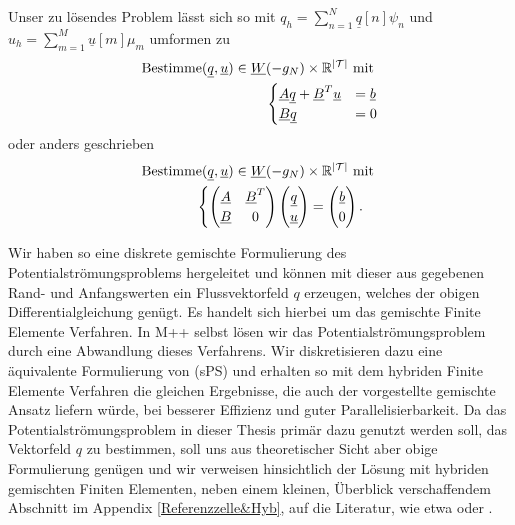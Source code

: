 Unser zu lösendes Problem lässt sich so mit $ q_h = \sum_{n=1}^{N} \underline{q}[n] \psi_n $ und $ u_h = \sum_{m=1}^{M} \underline{u}[m] \mu_m $ umformen zu 
\begin{align*}
\text{Bestimme} (\underline{q},\underline{u}) \in \underline{W}(-g_N)\times \mathbb{R}^{|\mathcal{T}|} \text{ mit }\\
\begin{cases}
\underline{A} \underline{q} + \underline{B}^T \underline{u} &= \underline{b} \\
\underline{B} \underline{q} &= 0
\end{cases}
\end{align*}
oder anders geschrieben 
\begin{align*}
\text{Bestimme} (\underline{q},\underline{u}) \in \underline{W}(-g_N)\times \mathbb{R}^{|\mathcal{T}|} \text{ mit }\\
\begin{cases}
\begin{pmatrix}
\underline{A} &\underline{B}^T\\
\underline{B} &0
\end{pmatrix}
\begin{pmatrix}
\underline{q} \\
\underline{u} 
\end{pmatrix}
=
\begin{pmatrix}
\underline{b}\\
0
\end{pmatrix}.
\end{cases}
\end{align*}

Wir haben so eine diskrete gemischte Formulierung des Potentialströmungsproblems hergeleitet und können mit dieser aus gegebenen Rand- und Anfangswerten ein Flussvektorfeld $q$ erzeugen, welches der obigen Differentialgleichung genügt.
Es handelt sich hierbei um das gemischte Finite Elemente Verfahren. In M++ selbst lösen wir das Potentialströmungsproblem durch eine Abwandlung dieses Verfahrens. Wir diskretisieren dazu eine äquivalente Formulierung von (sPS) und erhalten so mit dem hybriden Finite Elemente Verfahren die gleichen Ergebnisse, die auch der vorgestellte gemischte Ansatz liefern würde, bei besserer Effizienz und guter Parallelisierbarkeit. Da das Potentialströmungsproblem in dieser Thesis primär dazu genutzt werden soll, das Vektorfeld $q$ zu bestimmen, soll uns aus theoretischer Sicht aber obige Formulierung genügen und wir verweisen hinsichtlich der Lösung mit hybriden gemischten Finiten Elementen, neben einem kleinen, Überblick verschaffendem Abschnitt im Appendix \ref{Referenzzelle&Hyb}, auf die Literatur, wie etwa \cite{brezzi2012mixed} oder  \cite{roberts1991mixed}.











